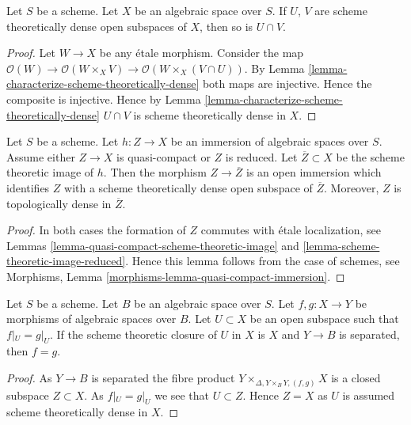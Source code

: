 \begin{lemma}
\label{lemma-intersection-scheme-theoretically-dense}
Let $S$ be a scheme. Let $X$ be an algebraic space over $S$.
If $U$, $V$ are scheme theoretically dense
open subspaces of $X$, then so is $U \cap V$.
\end{lemma}

\begin{proof}
Let $W \to X$ be any \'etale morphism. Consider the map
$\mathcal{O}(W) \to \mathcal{O}(W \times_X V)
\to \mathcal{O}(W \times_X (V \cap U))$.
By Lemma \ref{lemma-characterize-scheme-theoretically-dense}
both maps are injective. Hence the composite is injective.
Hence by Lemma \ref{lemma-characterize-scheme-theoretically-dense}
$U \cap V$ is scheme theoretically dense in $X$.
\end{proof}

\begin{lemma}
\label{lemma-quasi-compact-immersion}
Let $S$ be a scheme. Let $h : Z \to X$ be an immersion of algebraic spaces
over $S$. Assume either $Z \to X$ is quasi-compact or $Z$ is reduced.
Let $\overline{Z} \subset X$ be the scheme theoretic image of $h$.
Then the morphism $Z \to \overline{Z}$ is an open immersion
which identifies $Z$ with a scheme theoretically dense open
subspace of $\overline{Z}$. Moreover, $Z$ is topologically
dense in $\overline{Z}$.
\end{lemma}

\begin{proof}
In both cases the formation of $Z$ commutes with \'etale localization, see
Lemmas \ref{lemma-quasi-compact-scheme-theoretic-image} and
\ref{lemma-scheme-theoretic-image-reduced}.
Hence this lemma follows from the case of schemes, see
Morphisms, Lemma \ref{morphisms-lemma-quasi-compact-immersion}.
\end{proof}

\begin{lemma}
\label{lemma-equality-of-morphisms}
Let $S$ be a scheme. Let $B$ be an algebraic space over $S$.
Let $f, g : X \to Y$ be morphisms of algebraic spaces over $B$.
Let $U \subset X$ be an open subspace such that
$f|_U = g|_U$. If the scheme theoretic closure of $U$
in $X$ is $X$ and $Y \to B$ is separated, then $f = g$.
\end{lemma}

\begin{proof}
As $Y \to B$ is separated the fibre product
$Y \times_{\Delta, Y \times_B Y, (f, g)} X$ is a closed subspace $Z \subset X$. 
As $f|_U = g|_U$ we see that $U \subset Z$. Hence $Z = X$ as $U$ is assumed
scheme theoretically dense in $X$.
\end{proof}











